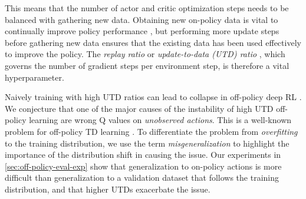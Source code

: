 This means that the number of actor and critic optimization steps needs to be balanced with gathering new data.
Obtaining new on-policy data is vital to continually improve policy performance \parencite{ostrovski2021difficulty}, but performing more update steps before gathering new data ensures that the existing data has been used effectively to improve the policy.
The \emph{replay ratio} \parencite{fedus2020revisiting} or \emph{update-to-data (UTD) ratio} \parencite{nikishin2022primacy}, which governs the number of gradient steps per environment step, is therefore a vital hyperparameter.

Naively training with high UTD ratios can lead to collapse in off-policy deep RL \parencite{nikishin2022primacy}.
We conjecture that one of the major causes of the instability of high UTD off-policy learning are wrong Q values on \emph{unobserved actions}.
This is a well-known problem for off-policy TD learning \parencite{baird1995residual,tsitsiklis1996analysis,sutton2016emphatic,ghosh2020representations}.
To differentiate the problem from \emph{overfitting} to the training distribution, we use the term \emph{misgeneralization} to highlight the importance of the distribution shift in causing the issue.
Our experiments in \autoref{sec:off-policy-eval-exp} show that generalization to on-policy actions is more difficult than generalization to a validation dataset that follows the training distribution, and that higher UTDs exacerbate the issue.

